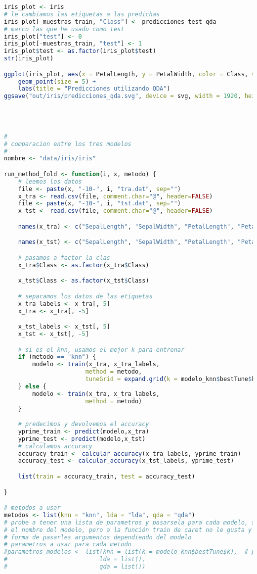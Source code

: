 \begin{lstlisting}[language=R]
iris_plot <- iris
# le cambiamos las etiquetas a las predichas
iris_plot[-muestras_train, "Class"] <- predicciones_test_qda
# marco las que he usado como test
iris_plot["test"] <- 0
iris_plot[-muestras_train, "test"] <- 1
iris_plot$test <- as.factor(iris_plot$test)
str(iris_plot)

ggplot(iris_plot, aes(x = PetalLength, y = PetalWidth, color = Class, shape = test)) +
	geom_point(size = 5) +
	labs(title = "Predicciones utilizando QDA")
ggsave("out/iris/predicciones_qda.svg", device = svg, width = 1920, height = 1080, units = "px", dpi = 150)




#
# comparacion entre los tres modelos
#
nombre <- "data/iris/iris"

run_method_fold <- function(i, x, metodo) {
	# leemos los datos
	file <- paste(x, "-10-", i, "tra.dat", sep="")
	x_tra <- read.csv(file, comment.char="@", header=FALSE)
	file <- paste(x, "-10-", i, "tst.dat", sep="")
	x_tst <- read.csv(file, comment.char="@", header=FALSE)

	names(x_tra) <- c("SepalLength", "SepalWidth", "PetalLength", "PetalWidth", "Class")

	names(x_tst) <- c("SepalLength", "SepalWidth", "PetalLength", "PetalWidth", "Class")

	# pasamos a factor la clas
	x_tra$Class <- as.factor(x_tra$Class)

	x_tst$Class <- as.factor(x_tst$Class)

	# separamos los datos de las etiquetas
	x_tra_labels <- x_tra[, 5]
	x_tra <- x_tra[, -5]

	x_tst_labels <- x_tst[, 5]
	x_tst <- x_tst[, -5]

	# si es el knn, usamos el mejor k para entrenar
	if (metodo == "knn") {
		modelo <- train(x_tra, x_tra_labels,
					   method = metodo,
					   tuneGrid = expand.grid(k = modelo_knn$bestTune$k))
	} else {
		modelo <- train(x_tra, x_tra_labels,
					   method = metodo)
	}

	# predecimos y devolvemos el accuracy
	yprime_train <- predict(modelo,x_tra)
	yprime_test <- predict(modelo,x_tst)
	# calculamos accuracy
	accuracy_train <- calcular_accuracy(x_tra_labels, yprime_train)
	accuracy_test <- calcular_accuracy(x_tst_labels, yprime_test)

	list(train = accuracy_train, test = accuracy_test)

}

# metodos a usar
metodos <- list(knn = "knn", lda = "lda", qda = "qda")
# probe a tener una lista de parametros y pasarsela para cada modelo, sabiendo
# el nombre del modelo, pero a la función train de caret no le gusta y no he encontrado
# forma de pasarles argumentos dependiendo del modelo
# parametros a usar para cada metodo
#parametros_modelos <- list(knn = list(k = modelo_knn$bestTune$k),  # para knn escogemos la mejor k obtenida
#						   lda = list(),
#						   qda = list())


\end{lstlisting}

